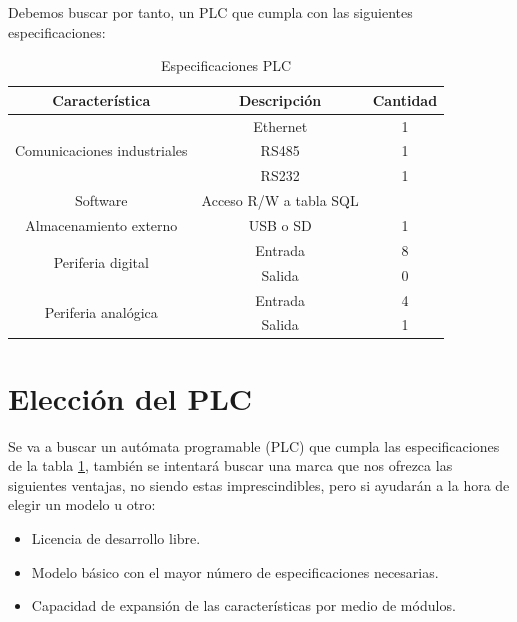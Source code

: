 Debemos buscar por tanto, un PLC que cumpla con las siguientes especificaciones:

\begin{table}[H]
\centering
\begin{tabular}{|c|c|c|}
\hline
\textbf{Característica }                              & \textbf{Descripción}            & \textbf{Cantidad} \\ \hline
\multirow{3}{*}{Comunicaciones industriales} & Ethernet               & 1        \\ \cline{2-3} 
                                             & RS485                  & 1        \\ \cline{2-3} 
                                             & RS232                  & 1        \\ \hline
Software                                     & Acceso R/W a tabla SQL &          \\ \hline
Almacenamiento externo                       & USB o SD               & 1        \\ \hline
\multirow{2}{*}{Periferia digital}           & Entrada                & 8        \\ \cline{2-3} 
                                             & Salida                 & 0        \\ \hline
\multirow{2}{*}{Periferia analógica}         & Entrada                & 4        \\ \cline{2-3} 
                                             & Salida                 & 1        \\ \hline
\end{tabular}
\caption{Especificaciones PLC}
\label{tab:espc_plc}
\end{table}

\section{Elección del PLC}
\label{eleccion_PLC}

Se va a buscar un autómata programable (PLC) que cumpla las especificaciones de la tabla \ref{tab:espc_plc}, también se intentará buscar una marca que nos ofrezca las siguientes ventajas, no siendo estas imprescindibles, pero si ayudarán a la hora de elegir un modelo u otro:

\begin{itemize}
		\item{Licencia de desarrollo libre.}
		\item{Modelo básico con el mayor número de especificaciones necesarias.}
		\item{Capacidad de expansión de las características por medio de módulos.}
\end{itemize}


